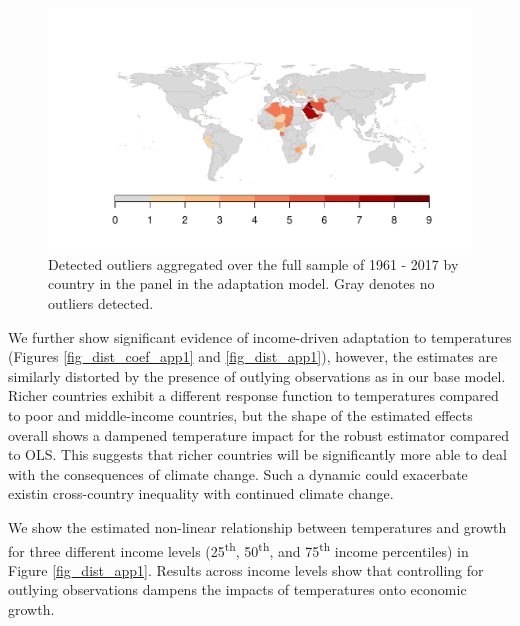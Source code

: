 \documentclass[11pt, letterpaper]{article}
\numberwithin{algorithm}{section}
\numberwithin{assumption}{section}
\numberwithin{lemma}{section}
\numberwithin{theorem}{section}
\numberwithin{corollary}{section}
\numberwithin{remark}{section}
\numberwithin{equation}{section}
\numberwithin{figure}{section}
\numberwithin{table}{section}
\begin{document}
\begin{figure}[!htbp]  %
\centering
\includegraphics[width = \textwidth]{ctry_map_adapt.pdf}
\caption{Detected outliers aggregated over the full sample of 1961 - 2017 by country in the panel in the adaptation model. Gray denotes no outliers detected.}
\label{fig_map_app1}
\end{figure}

\clearpage

We further show significant evidence of income-driven adaptation to temperatures (Figures \ref{fig_dist_coef_app1} and \ref{fig_dist_app1}), however, the estimates are similarly distorted by the presence of outlying observations as in our base model. Richer countries exhibit a different response function to temperatures compared to poor and middle-income countries, but the shape of the estimated effects overall shows a dampened temperature impact for the robust estimator compared to OLS. This suggests that richer countries will be significantly more able to deal with the consequences of climate change. Such a dynamic could exacerbate existin cross-country inequality with continued climate change.

We show the estimated non-linear relationship between temperatures and growth for three different income levels (25\textsuperscript{th}, 50\textsuperscript{th}, and 75\textsuperscript{th} income percentiles) in Figure \ref{fig_dist_app1}. Results across income levels show that controlling for outlying observations dampens the impacts of temperatures onto economic growth.
\end{document}
